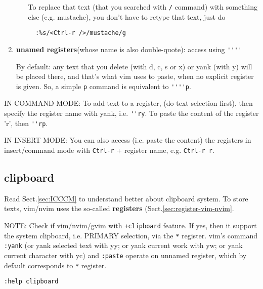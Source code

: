 \begin{enumerate}
\begin{itemize}
    To replace that text (that you searched with \verb!/! command) with
    something else (e.g. mustache), you don't have to retype that text, just do
  \begin{verbatim}
  :%s/<Ctrl-r />/mustache/g
  \end{verbatim}
        
  \end{itemize}
  
  
  \item  {\bf unamed registers}(whose name is also double-quote): access using
  \verb!''''!
  
  By default: any text that you delete (with d, c, s or x) or yank (with y) will
  be placed there, and that's what vim uses to paste, when no explicit register
  is given. So, a simple \verb!p! command is equivalent to \verb!''''p!. 
\end{enumerate}

IN COMMAND MODE: To add text to a register, (do text selection first), then
specify the register name with yank, i.e. \verb!''ry!. To paste the content of the register 'r', then
\verb!''rp!. 

IN INSERT MODE: You can also access (i.e. paste the content) the registers in
insert/command mode with \verb!Ctrl-r! + register name, e.g. \verb!Ctrl-r r!. 


\subsection{clipboard}
\label{sec:clipboard}

Read Sect.\ref{sec:ICCCM} to understand better about clipboard system.
To store texts, vim/nvim uses the so-called {\bf registers}
(Sect.\ref{sec:register-vim-nvim}.

NOTE: Check if vim/nvim/gvim with \verb!+clipboard! feature.
If yes, then it support the system clipboard, i.e. PRIMARY selection, via the
\verb!*! register. vim's command \verb!:yank! (or yank selected text with yy; or
yank current work with yw; or yank current character with yc) and \verb!:paste!
operate on unnamed register, which by default corresponds to \verb!*! register.

 
\begin{verbatim}
:help clipboard
\end{verbatim}

